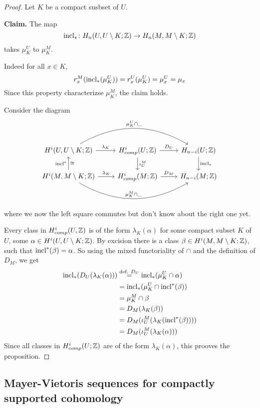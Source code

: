 \documentclass[language=english]{TemplateLecture}
\begin{document}
\begin{proof}
    Let \(K\) be a compact susbset of \(U\).

    \textbf{Claim.} The map
    \[\operatorname{incl}_*\colon H_n(U, U\setminus K; \mathbb{Z}) \to H_n(M, M\setminus K; \mathbb{Z})\]
    takes \(\mu_K^U\) to \(\mu_K^M\).

    Indeed for all \(x \in K\),
    \[r_x^M(\operatorname{incl}_*(\mu_K^U)) = r_x^U(\mu_K^U) = \mu_x^U = \mu_x\]
    Since this property characterizse \(\mu_K^M\), the claim holds.

    Consider the diagram
    \[\begin{tikzcd}
        H^i(U, U\setminus K; \IZ) \ar[r, "\lambda_K"] \ar[rr, bend left, "\mu_K^U \cap \_"] & H^i_{comp}(U; \IZ) \ar[d, "\iota_U^M"] \ar[r, "D_U"] & H_{n-i}(U; \IZ) \ar[d, "\incl_*"] \\
        H^i(M, M\setminus K; \IZ) \ar[u, "\incl^*", "\cong"'] \ar[rr, bend right, "\mu_K^M \cap \_"] \ar[r, "\lambda_K"] & H^i_{comp}(M; \IZ) \ar[r, "D_M"] & H_{n-i}(M; \IZ) \\
    \end{tikzcd}\]
    where we now the left square commutes but don't know about the right one yet.

    Every class in \(H^i_{comp}(U, \mathbb{Z})\) is of the form \(\lambda_K(\alpha)\) for some compact subset \(K\) of \(U\), some \(\alpha \in H^i(U, U\setminus K; \mathbb{Z})\).
    By excision there is a class \(\beta \in H^i(M, M\setminus K; \mathbb{Z})\), such that \(\operatorname{incl}^*(\beta) = \alpha\). So using the mixed functoriality of \(\cap\) and the definition of \(D_M\), we get
    \[\begin{split}
        \operatorname{incl}_*(D_U(\lambda_K(\alpha))) &\overset{\text{def. } D_U}= \operatorname{incl}_*(\mu_K^U \cap \alpha) \\
        &= \operatorname{incl}_*(\mu_K^U \cap \operatorname{incl}^*(\beta)) \\
        &= \mu_K^M \cap \beta \\
        &= D_M(\lambda_K(\beta)) \\
        &= D_M(\iota_U^M(\lambda_K(\operatorname{incl}^*(\beta)))) \\
        &= D_M(\iota_U^M(\lambda_K(\alpha))) \\
    \end{split}\]
    Since all classes in \(H_{comp}^i(U; \mathbb{Z})\) are of the form \(\lambda_K(\alpha)\), this prooves the proposition.
\end{proof}



\subsection{Mayer-Vietoris sequences for compactly supported cohomology}
\end{document}
